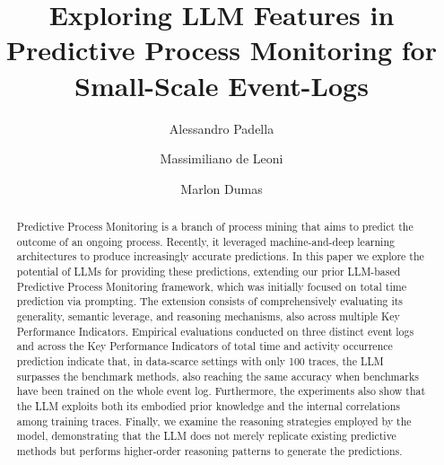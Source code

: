 \documentclass[manuscript,screen,review]{acmart}
\begin{document}
\title{Exploring LLM Features in Predictive Process Monitoring for Small-Scale Event-Logs}

\author{Alessandro Padella}

\author{Massimiliano de Leoni}

\author{Marlon Dumas}



\renewcommand{\shortauthors}{Padella et al.}


\begin{abstract}
Predictive Process Monitoring is a branch of process mining that aims to predict the outcome of an ongoing process. Recently, it leveraged machine-and-deep learning architectures to produce increasingly accurate predictions. In this paper we explore the potential of LLMs for providing these predictions, extending our prior LLM-based Predictive Process Monitoring framework, which was initially focused on total time prediction via prompting. The extension consists of comprehensively evaluating its generality, semantic leverage, and reasoning mechanisms, also across multiple Key Performance Indicators. Empirical evaluations conducted on three distinct event logs and across the Key Performance Indicators of total time and activity occurrence prediction indicate that, in data-scarce settings with only 100 traces, the LLM surpasses the benchmark methods, also reaching the same accuracy when benchmarks have been trained on the whole event log. Furthermore, the experiments also show that the LLM exploits both its embodied prior knowledge and the internal correlations among training traces. Finally, we examine the reasoning strategies employed by the model, demonstrating that the LLM does not merely replicate existing predictive methods but performs higher-order reasoning patterns to generate the predictions.
\end{abstract}
\end{document}
